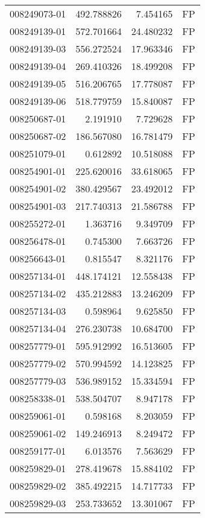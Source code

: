 \begin{tabular}{lrrl}
008249073-01 &  492.788826 &     7.454165 &   FP \\
008249139-01 &  572.701664 &    24.480232 &   FP \\
008249139-03 &  556.272524 &    17.963346 &   FP \\
008249139-04 &  269.410326 &    18.499208 &   FP \\
008249139-05 &  516.206765 &    17.778087 &   FP \\
008249139-06 &  518.779759 &    15.840087 &   FP \\
008250687-01 &    2.191910 &     7.729628 &   FP \\
008250687-02 &  186.567080 &    16.781479 &   FP \\
008251079-01 &    0.612892 &    10.518088 &   FP \\
008254901-01 &  225.620016 &    33.618065 &   FP \\
008254901-02 &  380.429567 &    23.492012 &   FP \\
008254901-03 &  217.740313 &    21.586788 &   FP \\
008255272-01 &    1.363716 &     9.349709 &   FP \\
008256478-01 &    0.745300 &     7.663726 &   FP \\
008256643-01 &    0.815547 &     8.321176 &   FP \\
008257134-01 &  448.174121 &    12.558438 &   FP \\
008257134-02 &  435.212883 &    13.246209 &   FP \\
008257134-03 &    0.598964 &     9.625850 &   FP \\
008257134-04 &  276.230738 &    10.684700 &   FP \\
008257779-01 &  595.912992 &    16.513605 &   FP \\
008257779-02 &  570.994592 &    14.123825 &   FP \\
008257779-03 &  536.989152 &    15.334594 &   FP \\
008258338-01 &  538.504707 &     8.947178 &   FP \\
008259061-01 &    0.598168 &     8.203059 &   FP \\
008259061-02 &  149.246913 &     8.249472 &   FP \\
008259177-01 &    6.013576 &     7.563629 &   FP \\
008259829-01 &  278.419678 &    15.884102 &   FP \\
008259829-02 &  385.492215 &    14.717733 &   FP \\
008259829-03 &  253.733652 &    13.301067 &   FP \\

\end{tabular}

